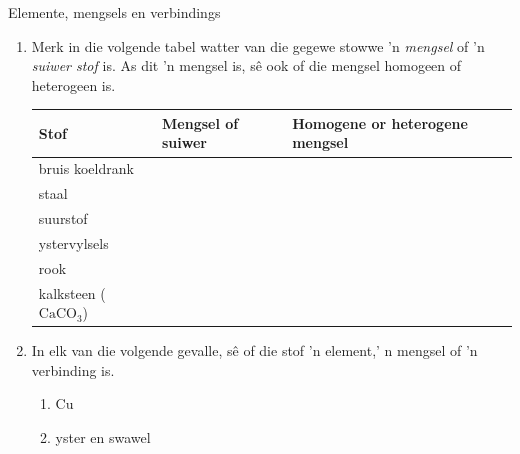 \par \label{m38708*secfhsst!!!underscore!!!id212}
            \begin{exercises}{Elemente, mengsels en verbindings}{
            \nopagebreak
            \label{m38708*id63472}
 \begin{enumerate}[noitemsep, label=\textbf{\arabic*}. ] 
            \label{m38708*uid28}
    \item Merk in die volgende tabel watter van die gegewe stowwe 'n \textsl{mengsel} of 'n \textsl{suiwer stof} is. As dit 'n mengsel is, sê ook of die mengsel homogeen of heterogeen is.
          \begin{table}[H]
        \begin{center}
      \label{m38708*id63499}
    \noindent
      \begin{tabular}{|l|l|l|}\hline
        \textbf{Stof} &
        \textbf{Mengsel of suiwer} &
        \textbf{Homogene or heterogene mengsel} \\ \hline
        bruis koeldrank & & \\ \hline
        staal & & \\ \hline
        suurstof & & \\ \hline
        ystervylsels & & \\ \hline
        rook & & \\ \hline
        kalksteen (${\text{CaCO}}_{3}$) & & \\ \hline
    \end{tabular}
      \end{center}
\end{table}
    \par
\label{m38708*uid29}\item In elk van die volgende gevalle, sê of die stof 'n element,' n mengsel of 'n verbinding is.
\label{m38708*id63912}\begin{enumerate}[noitemsep, label=\textbf{\alph*}. ] 
            \label{m38708*uid30}\item $\text{Cu}$
\label{m38708*uid31}\item yster en swawel

\end{enumerate}
\end{enumerate}}
\end{exercises}
